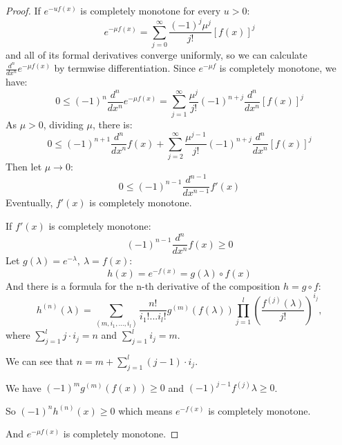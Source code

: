 \documentclass[11pt]{article}
\begin{document}
\begin{proof}
If $e^{-uf(x)}$ is completely monotone for every $u>0$:
\[e^{-\mu f(x)} = \sum_{j=0}^{\infty}\frac{(-1)^j\mu^j}{j!}[f(x)]^j\] and all of its formal derivatives converge uniformly, so we can calculate $\frac{d^n}{dx^n}e^{-\mu f(x)}$ by termwise differentiation.
Since $e^{-\mu f}$ is completely monotone, we have:
\[0\le(-1)^n\frac{d^n}{dx^n}e^{-\mu f(x)} = \sum_{j=1}^{\infty}\frac{\mu^j}{j!}(-1)^{n+j}\frac{d^n}{dx^n}[f(x)]^j\]
As $\mu > 0$, dividing $\mu$, there is:
\[0\le(-1)^{n+1}\frac{d^n}{dx^n}f(x)+\sum_{j=2}^{\infty}\frac{\mu^{j-1}}{j!}(-1)^{n+j}\frac{d^n}{dx^n}[f(x)]^j\]
Then let $\mu \rightarrow 0$:
\[0\le(-1)^{n-1}\frac{d^{n-1}}{dx^{n-1}}f'(x)\]
Eventually, $f'(x)$ is completely monotone.

If $f'(x)$ is completely monotone:
\[(-1)^{n-1}\frac{d^n}{dx^n}f(x)\ge0\]
Let $g(\lambda) = e^{-\lambda},~ \lambda = f(x)$:
\[h(x) = e^{- f(x)} = g(\lambda)\circ f(x)\]
And there is a formula for the n-th derivative of the composition $h = g\circ f$:
\[h^{(n)}(\lambda) = \sum_{(m,i_1,...,i_l)}^{}\frac{n!}{i_1!...i_l!}g^{(m)}(f(\lambda))\prod_{j=1}^{l}(\frac{f^{(j)}(\lambda)}{j!})^{i_j},\]
where $\sum_{j=1}^{l}j\cdot i_j = n$ and $\sum_{j=1}^{l}i_j = m$.

We can see that $n = m + \sum_{j=1}^{l}(j-1)\cdot i_j$.

We have $(-1)^mg^{(m)}(f(x)) \ge 0$ and $(-1)^{j-1}f^{(j)}\lambda \ge 0$. 

So $(-1)^nh^{(n)}(x) \ge 0$ which means $e^{-f(x)}$ is completely monotone.

And $e^{-\mu f(x)}$ is completely monotone.


\end{proof}
\end{document}
